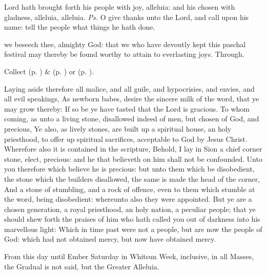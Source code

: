 
\introit
{} Lord hath brought forth his people with joy, alleluia: and his chosen with gladness, alleluia, alleluia. \textit{Ps.} O give thanks unto the Lord, and call upon his name: tell the people what things he hath done.

\collect
{} we beseech thee, almighty God: that we who have devoutly kept this paschal festival may thereby be found worthy to attain to everlasting joys. Through.
\begin{rubric}
     Collect  (p. \pageref{EasterCollect}) \&   (p. \pageref{SPAgainst}) or  (p. \pageref{SPChiefBishop}).
\end{rubric}

 Laying aside therefore all malice, and all guile, and hypocrisies, and envies, and all evil speakings, As newborn babes, desire the sincere milk of the word, that ye may grow thereby: If so be ye have tasted that the Lord is gracious. To whom coming, as unto a living stone, disallowed indeed of men, but chosen of God, and precious, Ye also, as lively stones, are built up a spiritual house, an holy priesthood, to offer up spiritual sacrifices, acceptable to God by Jesus Christ. Wherefore also it is contained in the scripture, Behold, I lay in Sion a chief corner stone, elect, precious: and he that believeth on him shall not be confounded. Unto you therefore which believe he is precious: but unto them which be disobedient, the stone which the builders disallowed, the same is made the head of the corner, And a stone of stumbling, and a rock of offence, even to them which stumble at the word, being disobedient: whereunto also they were appointed. But ye are a chosen generation, a royal priesthood, an holy nation, a peculiar people; that ye should shew forth the praises of him who hath called you out of darkness into his marvellous light: Which in time past were not a people, but are now the people of God: which had not obtained mercy, but now have obtained mercy.

\begin{rubric}
	From this day until Ember Saturday in Whitsun Week, inclusive, in all Masses, the Gradual is not said, but the Greater Alleluia. 
\end{rubric}


